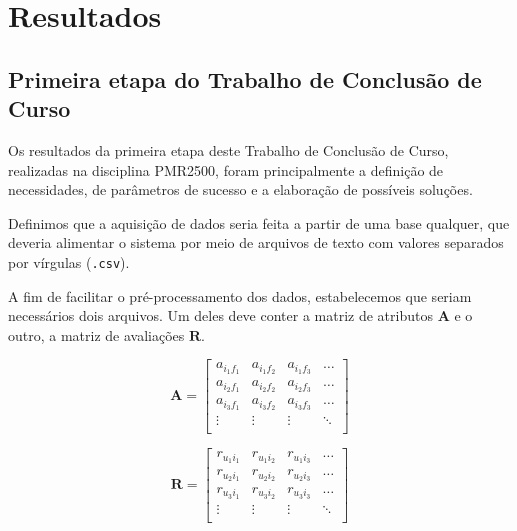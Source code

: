 \chapter[Resultados]{Resultados}
\label{chap:resultados}

\section{Primeira etapa do Trabalho de Conclusão de Curso} %
\label{sec:primeira_etapa_do_trabalho_de_conclus_o_de_curso}

Os resultados da primeira etapa deste Trabalho de Conclusão de Curso, realizadas na disciplina PMR2500, foram principalmente a definição de necessidades, de parâmetros de sucesso e a elaboração de possíveis soluções. 

Definimos que a aquisição de dados seria feita a partir de uma base qualquer, que deveria alimentar o sistema por meio de arquivos de texto com valores separados por vírgulas (\texttt{.csv}).

A fim de facilitar o pré-processamento dos dados, estabelecemos que seriam necessários dois arquivos. Um deles deve conter a matriz de atributos $\mathbf{A}$ e o outro, a matriz de avaliações  $\mathbf{R}$. 

\begin{equation} 
\mathbf{A} = 
\begin{bmatrix} 
 a_{i_1 f_1} &  a_{i_1 f_2} &  a_{i_1 f_3}  & \dots   \\
 a_{i_2 f_1} &  a_{i_2 f_2} &  a_{i_2 f_3}  & \dots   \\
 a_{i_3 f_1} &  a_{i_3 f_2} &  a_{i_3 f_3}  & \dots  \\ 
 \vdots &  \vdots &  \vdots  & \ddots   \\
 \end{bmatrix}
\end{equation}


\begin{equation}
	  \mathbf{R} = 
\begin{bmatrix} 
  r_{u_1 i_1} &  r_{u_1 i_2} &  r_{u_1 i_3}  & \dots   \\
 r_{u_2 i_1} &  r_{u_2 i_2} &  r_{u_2 i_3}  & \dots   \\
 r_{u_3 i_1} &  r_{u_3 i_2} &  r_{u_3 i_3}  & \dots  \\ 
 \vdots &  \vdots &  \vdots  & \ddots   \\
\end{bmatrix}
\end{equation}

